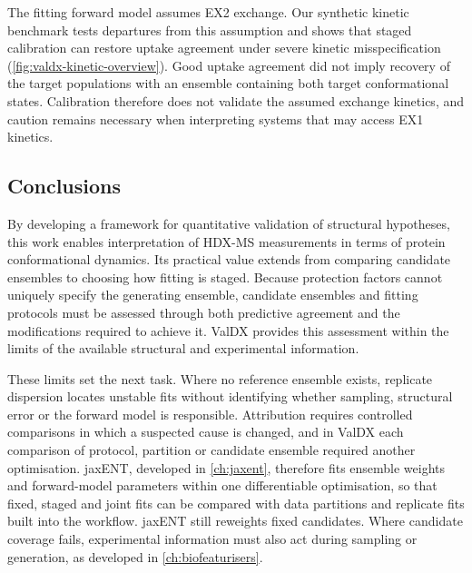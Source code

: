 The fitting forward model assumes EX2 exchange. Our synthetic kinetic benchmark tests departures from this assumption and shows that staged calibration can restore uptake agreement under severe kinetic misspecification (\cref{fig:valdx-kinetic-overview}). Good uptake agreement did not imply recovery of the target populations with an ensemble containing both target conformational states. Calibration therefore does not validate the assumed exchange kinetics, and caution remains necessary when interpreting systems that may access EX1 kinetics.

\subsection{Conclusions}
\label{sec:valdx-conclusions}

By developing a framework for quantitative validation of structural hypotheses, this work enables interpretation of HDX-MS measurements in terms of protein conformational dynamics. Its practical value extends from comparing candidate ensembles to choosing how fitting is staged. Because protection factors cannot uniquely specify the generating ensemble, candidate ensembles and fitting protocols must be assessed through both predictive agreement and the modifications required to achieve it. ValDX provides this assessment within the limits of the available structural and experimental information.

These limits set the next task. Where no reference ensemble exists, replicate dispersion locates unstable fits without identifying whether sampling, structural error or the forward model is responsible. Attribution requires controlled comparisons in which a suspected cause is changed, and in ValDX each comparison of protocol, partition or candidate ensemble required another optimisation. jaxENT, developed in \cref{ch:jaxent}, therefore fits ensemble weights and forward-model parameters within one differentiable optimisation, so that fixed, staged and joint fits can be compared with data partitions and replicate fits built into the workflow. jaxENT still reweights fixed candidates. Where candidate coverage fails, experimental information must also act during sampling or generation, as developed in \cref{ch:biofeaturisers}.
